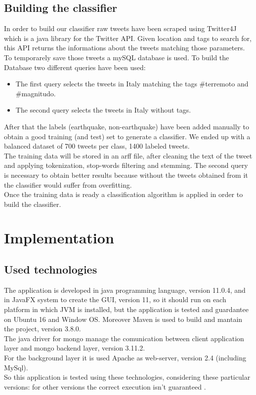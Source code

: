 \documentclass[a4paper, oneside]{article}
\begin{document}
\subsection{Building the classifier}
In order to build our classifier raw tweets have been scraped using Twitter4J which is a java library for the Twitter API. Given location and tags to search for, this API returns the informations about the tweets matching those parameters. To temporarely save those tweets a mySQL database is used. To build the Database two different queries have been used: 
\begin{itemize}
\item The first query selects the tweets in Italy matching the tags {\#}terremoto and {\#}magnitudo.
\item The second query selects the tweets in Italy without tags.
\end{itemize} 
After that the labels (earthquake, non-earthquake) have been added manually to obtain a good training (and test) set to generate a classifier. We ended up with a balanced dataset of 700 tweets per class, 1400 labeled tweets.\\
The training data will be stored in an arff file, after cleaning the text of the tweet and applying tokenization, stop-words filtering and stemming. The second query is necessary to obtain better results because without the tweets obtained from it the classifier would suffer from overfitting.\\
Once the training data is ready a classification algorithm is applied in order to build the classifier.

\clearpage

\section{Implementation}
\subsection{Used technologies}
The application is developed in java programming language, version 11.0.4, and in JavaFX system to create the GUI, version 11, so it should run on each platform in which JVM is installed, but the application is tested and guardantee on Ubuntu 16 and Window OS. Moreover Maven is used  to build and mantain the project, version 3.8.0. \\
The java driver for mongo manage the comunication between client application layer and mongo backend layer, version 3.11.2.\\ 
For the background layer it is used Apache as web-server, version 2.4 (including MySql).\\
So this application is tested using these technologies, considering these particular versions: for other versions the correct execution isn't guaranteed .\\
\end{document}
